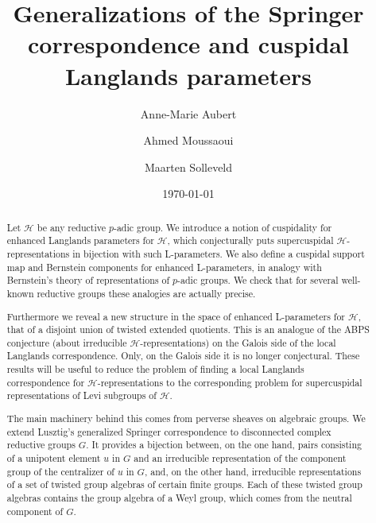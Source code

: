 \documentclass[11pt]{amsart}
\theoremstyle{definition}
\def\cH{{\mathcal H}}
\begin{document}
\title{Generalizations of the Springer correspondence and cuspidal Langlands parameters}

\author[A.-M. Aubert]{Anne-Marie Aubert}
\address{Institut de Math\'ematiques de Jussieu -- Paris Rive Gauche, 
U.M.R. 7586 du C.N.R.S., U.P.M.C., 4 place Jussieu 75005 Paris, France}
\author[A. Moussaoui]{Ahmed Moussaoui}
\address{Department of Mathematics and Statistics, University of Calgary, 
2500 University Drive NW, Calgary, Alberta, Canada}
\author[M. Solleveld]{Maarten Solleveld}
\address{IMAPP, Radboud Universiteit Nijmegen, Heyendaalseweg 135, 
6525AJ Nijmegen, the Netherlands}
\date{\today}
\maketitle

\begin{abstract}
Let $\cH$ be any reductive $p$-adic group. We introduce a notion of cuspidality for 
enhanced Langlands parameters for $\cH$, which conjecturally puts supercuspidal 
$\cH$-representations in bijection with such L-parameters. We also define a 
cuspidal support map and Bernstein components for enhanced L-parameters, in
analogy with Bernstein's theory of representations of $p$-adic groups. We check
that for several well-known reductive groups these analogies are actually precise. 

Furthermore we reveal a new structure in the space of enhanced L-parameters for
$\cH$, that of a disjoint union of twisted extended quotients. This is an analogue
of the ABPS conjecture (about irreducible $\cH$-representations) on the Galois side
of the local Langlands correspondence. Only, on the Galois side it is no longer conjectural.
These results will be useful to reduce the problem of finding a local Langlands 
correspondence for $\cH$-representations to the corresponding problem for 
supercuspidal representations of Levi subgroups of $\cH$.

The main machinery behind this comes from perverse sheaves on algebraic groups.
We extend Lusztig's generalized Springer correspondence to disconnected complex
reductive groups $G$. It provides a bijection between, on the one hand, pairs
consisting of a unipotent element $u$ in $G$ and an irreducible representation of the
component group of the centralizer of $u$ in $G$, and, on the other hand, irreducible 
representations of a set of twisted group algebras of certain finite groups.
Each of these twisted group algebras contains the group algebra of a Weyl group, which
comes from the neutral component of $G$.
\end{abstract}
\end{document}
